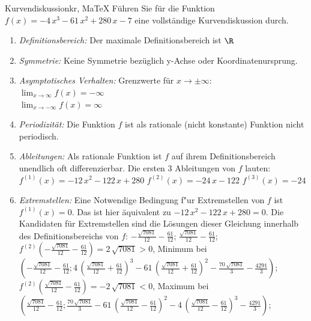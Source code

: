  \providecommand{\MoIl}{(} 
 \providecommand{\MoIr}{)}
 \providecommand{\MIntvlSep}{;} 
 \providecommand{\MElSetSep}{;} 
 \begin{MAufgabe}{Kurvendiskussion}{kr, MaTeX}
 F\"uhren Sie f\"ur die Funktion $f(x)= - 4\, x^3 - 61\, x^2 + 280\, x - 7$ eine vollst\"andige Kurvendiskussion durch.\\ 
 \ifLsg\Loesung
 \begin{enumerate}
 \item \emph{Definitionsbereich:} 
 Der maximale Definitionsbereich ist $\R$\item \emph{Symmetrie:} 
 Keine Symmetrie bez\"uglich y-Achse oder Koordinatenursprung.\item \emph{Asymptotisches Verhalten:} 
 Grenzwerte f\"ur $x\rightarrow \pm \infty$: \\ 
 $\lim_{x\rightarrow \infty} f(x)=- \infty$ \\ 
 $\lim_{x\rightarrow -\infty} f(x)=\infty$ \\ 
 \item \emph{Periodizit\"at:} 
 Die Funktion $f$ ist als rationale (nicht konstante) Funktion nicht periodisch.\item \emph{Ableitungen:} 
 Als rationale Funktion ist $f$ auf ihrem Definitionsbereich unendlich oft differenzierbar. 
 Die ersten 3 Ableitungen von $f$ lauten: \\ 
 $f^{(1)}(x)= - 12\, x^2 - 122\, x + 280$\newline 
  $f^{(2)}(x)= - 24\, x - 122$\newline 
  $f^{(3)}(x)=-24$\newline 
  \item \emph{Extremstellen:} 
 Eine Notwendige Bedingung f"ur Extremstellen von $f$ ist $f^{(1)}(x)=0$. 
 Das ist hier \"aquivalent zu $ - 12\, x^2 - 122\, x + 280=0$. 
 Die Kandidaten f\"ur Extremstellen sind die L\"osungen dieser Gleichung innerhalb des Definitionsbereichs von $f$: $ - \frac{\sqrt{7081}}{12} - \frac{61}{12}$; $\frac{\sqrt{7081}}{12} - \frac{61}{12}$; \\ 
 $f^{(2)}( - \frac{\sqrt{7081}}{12} - \frac{61}{12})=2\, \sqrt{7081}$$>0$, Minimum bei $( - \frac{\sqrt{7081}}{12} - \frac{61}{12};4\, {\left(\frac{\sqrt{7081}}{12} + \frac{61}{12}\right)}^3 - 61\, {\left(\frac{\sqrt{7081}}{12} + \frac{61}{12}\right)}^2 - \frac{70\, \sqrt{7081}}{3} - \frac{4291}{3})$; \\ 
 $f^{(2)}(\frac{\sqrt{7081}}{12} - \frac{61}{12})=- 2\, \sqrt{7081}$$<0$, Maximum bei $(\frac{\sqrt{7081}}{12} - \frac{61}{12};\frac{70\, \sqrt{7081}}{3} - 61\, {\left(\frac{\sqrt{7081}}{12} - \frac{61}{12}\right)}^2 - 4\, {\left(\frac{\sqrt{7081}}{12} - \frac{61}{12}\right)}^3 - \frac{4291}{3})$; \\ 

\end{enumerate}
\end{MAufgabe}
